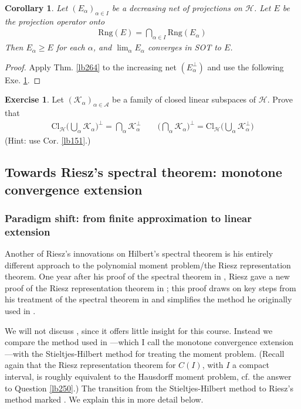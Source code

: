 \documentclass[12pt,b5paper,notitlepage]{article}
\theoremstyle{definition}
\newtheorem{exe}[df]{Exercise}
\theoremstyle{plain}
\newtheorem{co}[df]{Corollary}
\newcommand{\scr}{\mathscr}
\newcommand{\Rng}{\mathrm{Rng}}
\newcommand{\Cl}{\mathrm{Cl}}
\newcommand{\MH}{\mathcal H}
\newcommand{\MK}{\mathcal K}
\numberwithin{equation}{section}
\begin{document}
\begin{co}\label{lb266}
Let $(E_\alpha)_{\alpha\in I}$ be a decreasing net of projections on $\MH$. Let $E$ be the projection operator onto
\begin{align*}
\Rng(E)=\bigcap_{\alpha\in I}\Rng(E_\alpha)
\end{align*}
Then $E_\alpha\geq E$ for each $\alpha$, and $\lim_\alpha E_\alpha$ converges in SOT to $E$.
\end{co}


\begin{proof}
Apply Thm. \ref{lb264} to the increasing net $(E_\alpha^\perp)$ and use the following Exe. \ref{lb265}.
\end{proof}


\begin{exe}\label{lb265}
Let $(\MK_\alpha)_{\alpha\in\scr A}$ be a family of closed linear subspaces of $\MH$. Prove that
\begin{gather}
\Cl_\MH\Big(\bigcup_\alpha\MK_\alpha\Big)^\perp=\bigcap_\alpha\MK_\alpha^\perp \qquad\Big(\bigcap_\alpha \MK_\alpha\Big)^\perp=\Cl_\MH\Big(\bigcup_\alpha\MK_\alpha^\perp\Big)
\end{gather}
(Hint: use Cor. \ref{lb151}.)
\end{exe}





\subsection{Towards Riesz's spectral theorem: monotone convergence extension}\label{lb257}


\subsubsection{Paradigm shift: from finite approximation to linear extension}\label{lb290}


Another of Riesz's innovations on Hilbert's spectral theorem is his entirely different approach to the polynomial moment problem/the Riesz representation theorem. One year after his proof of the spectral theorem in \cite{Rie13}, Riesz gave a new proof of the Riesz representation theorem in \cite{Rie14}; this proof draws on key steps from his treatment of the spectral theorem in \cite{Rie13} and simplifies the method he originally used in \cite{Rie11}.

We will not discuss \cite{Rie11}, since it offers little insight for this course. Instead we compare the method used in \cite{Rie13,Rie14}---which I call the monotone convergence extension---with the Stieltjes-Hilbert method for treating the moment problem. (Recall again that the Riesz representation theorem for $C(I)$, with $I$ a compact interval, is roughly equivalent to the Hausdorff moment problem, cf. the answer to Question \ref{lb250}.) The transition from the Stieltjes-Hilbert method to Riesz's method marked . We explain this in more detail below.
\end{document}
